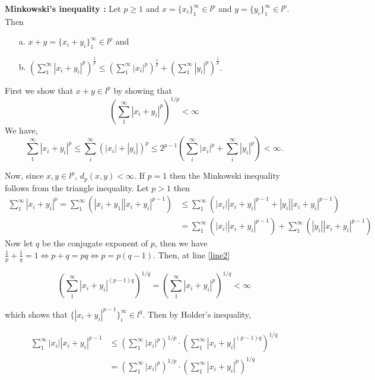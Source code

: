 \documentclass[12pt]{article}
\begin{document}
\begin{enumerate}
\begin{mybox}
    \textbf{Minkowski's inequality :} Let $p\geq 1$ and
    $x=\{x_{i}\}_{1}^{\infty} \in l^p$ and
    $y=\{y_{i}\}_{1}^{\infty} \in l^p$. Then

    \begin{enumerate}
        \item[a.]
              $x+y =
              \{x_{i} + y_{i}\}_{1}^{\infty} \in l^{p}$ and
        \item[b.]
              $(\sum_{1}^{\infty}{|x_{i} + y_{i}|^p})^
              \frac{1}{p}\leq
              (\sum_{1}^{\infty}{|x_{i}|^{p}})^{\frac{1}{p}}
              +
              (\sum_{1}^{\infty}{|y_{i}|^{p}})^{\frac{1}{p}}.$
    \end{enumerate}
    First we show that $x+y\in l^p$ by showing that
    $$\left(\sum_{1}^{\infty}{|x_{i} + y_{i}|^p}\right)^{1/p}
    <\infty$$
    We have,
    $$\sum_{1}^{\infty}{|x_{i} + y_{i}|^p}\leq
    \sum_i^{\infty}{\left(|x_i|+|y_i|\right)^p}\leq
    2^{p-1}\left(\sum_i^{\infty}{|x_i|^p}+
    \sum_i^{\infty}{|y_i|^p}\right)<\infty.$$

    Now, since $x,y\in l^p$, $d_p(x,y)<\infty$.
    If $p=1$ then the Minkowski inequality follows from the
    triangle inequality. Let $p>1$ then
    \begin{align}\sum_{1}^{\infty}{|x_{i} + y_{i}|^p}=
    \sum_{1}^{\infty}{\left(|x_i+y_1||x_{i} + y_{i}|^{p-1}\right)}
    &\leq\sum_{1}^{\infty}{\left(|x_i||x_{i} + y_{i}|^{p-1}
    +|y_i||x_{i} + y_{i}|^{p-1}\right)}\label{line1}\\
    &=\sum_{1}^{\infty}{\left(|x_i||x_{i} + y_{i}|^{p-1}\right)}
    +\sum_{1}^{\infty}{\left(|y_i||x_{i} + y_{i}|^{p-1}\right)}
    \label{line2}
    \end{align}
    Now let $q$ be the conjugate exponent of $p$, then we have
    $\frac{1}{p}+\frac{1}{q}=1 \iff p+q=pq \iff p=p(q-1)$. Then,
    at line
    \ref{line2}

    $$\left(\sum_{1}^{\infty}{|x_i+y_i|^{(p-1)q}}\right)^{1/q}
    =\left(\sum_{1}^{\infty}{|x_i+y_i|^{p}}\right)^{1/q}
    <\infty$$

    which shows that $\{|x_i+y_i|^{p-1}\}_i^{\infty}\in
    l^q$. Then by Holder's inequality,

    \begin{align}\sum_{1}^{\infty}{|x_i||x_{i} + y_{i}|^{p-1}}
      &\leq \left(\sum_{1}^{\infty}{|x_i|^p}\right)^{1/p}\cdot
      \left(\sum_{1}^{\infty}{|x_i+y_i|^{(p-1)q}}\right)^{1/q}\\
      &=\left(\sum_{1}^{\infty}{|x_i|^p}\right)^{1/p}\cdot
      \left(\sum_{1}^{\infty}{|x_i+y_i|^{p}}\right)^{1/q}
      \label{line4}
    \end{align}


\end{mybox}
\end{enumerate}
\end{document}
